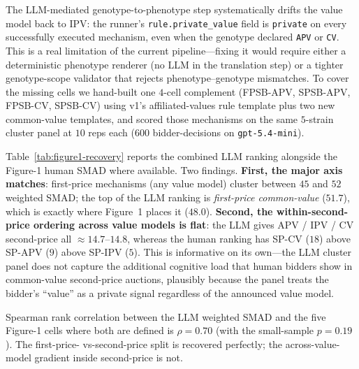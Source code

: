 \documentclass[12pt]{article}
\begin{document}
The LLM-mediated genotype-to-phenotype step systematically drifts
the value model back to IPV: the runner's
\texttt{rule.private\_value} field is \texttt{private} on every
successfully executed mechanism, even when the genotype declared
\texttt{APV} or \texttt{CV}. This is a real limitation of the
current pipeline---fixing it would require either a deterministic
phenotype renderer (no LLM in the translation step) or a tighter
genotype-scope validator that rejects phenotype--genotype
mismatches. To cover the missing cells we hand-built one $4$-cell
complement (FPSB-APV, SPSB-APV, FPSB-CV, SPSB-CV) using v1's
affiliated-values rule template plus two new common-value
templates, and scored those mechanisms on the same $5$-strain
cluster panel at $10$ reps each ($600$ bidder-decisions on
\texttt{gpt-5.4-mini}).

Table~\ref{tab:figure1-recovery} reports the combined LLM ranking
alongside the Figure-1 human SMAD where available. Two findings.
\textbf{First, the major axis matches}: first-price mechanisms
(any value model) cluster between $45$ and $52$ weighted SMAD; the
top of the LLM ranking is \emph{first-price common-value}
($51.7$), which is exactly where Figure~1 places it ($48.0$).
\textbf{Second, the within-second-price ordering across value
models is flat}: the LLM gives APV / IPV / CV second-price all
$\approx 14.7$--$14.8$, whereas the human ranking has
SP-CV ($18$) above SP-APV ($9$) above SP-IPV ($5$). This is
informative on its own---the LLM cluster panel does not capture
the additional cognitive load that human bidders show in
common-value second-price auctions, plausibly because the panel
treats the bidder's ``value'' as a private signal regardless of
the announced value model.

Spearman rank correlation between the LLM weighted SMAD and the
five Figure-1 cells where both are defined is
$\rho = 0.70$ (with the small-sample $p = 0.19$). The first-price-
vs-second-price split is recovered perfectly; the across-value-
model gradient inside second-price is not.
\end{document}
